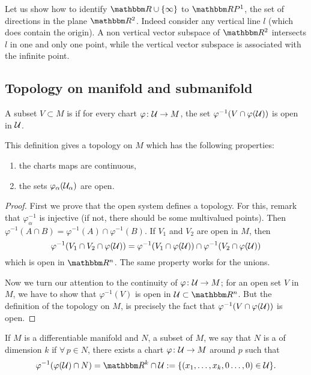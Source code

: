 Let us show how to identify $\eR\cup\{ \infty \}$ to $\eR P^1$, the set of directions in the plane $\eR^2$. Indeed consider any vertical line $l$ (which does contain the origin). A non vertical vector subspace of $\eR^2$ intersects $l$ in one and only one point, while the vertical vector subspace is associated with the infinite point.


\subsection{Topology on manifold and submanifold}

A subset $V\subset M$ is  if for every chart $\varphi\colon \mathcal{U}\to M$, the set $\varphi^{-1}(V\cap\varphi(\mathcal{U}))$ is open in $\mathcal{U}$.

\begin{theorem}
This definition gives a topology on $M$ which has the following properties:

\begin{enumerate}
\item the charts maps are continuous,
\item the sets $\varphi_{\alpha}(\mathcal{U}_{\alpha})$ are open.
\end{enumerate}

\end{theorem}

\begin{proof}
First we prove that the open system defines a topology. For this, remark that $\varphi_{\alpha}^{-1}$ is injective (if not, there should be some multivalued points). Then $\varphi^{-1}(A\cap B)=\varphi^{-1}(A)\cap\varphi^{-1}(B)$. If $V_1$ and $V_2$ are open in $M$, then
\[
  \varphi^{-1}(V_1\cap V_2\cap\varphi(\mathcal{U}))=\varphi^{-1}(V_1\cap\varphi(\mathcal{U}))\cap\varphi^{-1}(V_2\cap\varphi(\mathcal{U}))
\]
which is open in $\eR^n$. The same property works for the unions.

Now we turn our attention to the continuity of $\varphi\colon \mathcal{U}\to M$; for an open set $V$ in $M$, we have to show that $\varphi^{-1}(V)$ is open in $\mU\subset\eR^n$. But the definition of the topology on $M$, is precisely the fact that $\varphi^{-1}(V\cap\varphi(\mathcal{U}))$ is open.
\end{proof}

If $M$ is a differentiable manifold and $N$, a subset of $M$, we say that $N$ is a  of dimension $k$ if $\forall\,p\in N$, there exists a chart $\varphi\colon \mathcal{U}\to M$ around $p$ such that
\[
   \varphi^{-1}(\varphi(\mU)\cap N)=\eR^k\cap\mU:=\{(x_1,\ldots,x_k,0\ldots,0)\in\mU\}.
\]

